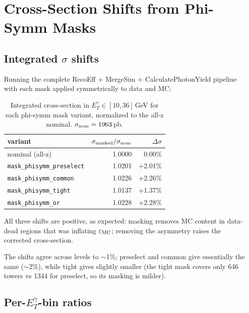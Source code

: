 \documentclass[11pt,a4paper]{article}
\newcommand{\etg}{\ensuremath{E_T^\gamma}}
\begin{document}
\section{Cross-Section Shifts from Phi-Symm Masks}
\label{sec:xsec}

\subsection{Integrated $\sigma$ shifts}

Running the complete RecoEff + MergeSim + CalculatePhotonYield
pipeline with each mask applied symmetrically to data and MC:

\begin{table}[H]
  \centering
  \caption{Integrated cross-section in $\etg \in [10, 36]$\,GeV for
  each phi-symm mask variant, normalized to the all-z nominal.
  $\sigma_{\rm nom} = 1963$\,pb.}
  \label{tab:phisymm_shifts}
  \begin{tabular}{lrr}
    \toprule
    variant & $\sigma_{\rm masked}/\sigma_{\rm nom}$ & $\Delta\sigma$ \\
    \midrule
    nominal (all-z)                   & 1.0000 & 0.00\% \\
    \texttt{mask\_phisymm\_preselect} & 1.0201 & +2.01\% \\
    \texttt{mask\_phisymm\_common}    & 1.0226 & +2.26\% \\
    \texttt{mask\_phisymm\_tight}     & 1.0137 & +1.37\% \\
    \texttt{mask\_phisymm\_or}        & 1.0228 & +2.28\% \\
    \bottomrule
  \end{tabular}
\end{table}

All three shifts are positive, as expected: masking removes MC
content in data-dead regions that was inflating $\varepsilon_{\rm MC}$;
removing the asymmetry raises the corrected cross-section.

The shifts agree across levels to $\sim$1\%; preselect and common
give essentially the same ($\sim$2\%), while tight gives slightly
smaller (the tight mask covers only 646 towers vs 1344 for preselect,
so its masking is milder).

\subsection{Per-\etg-bin ratios}
\end{document}
